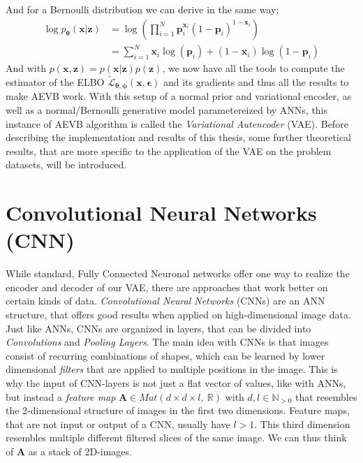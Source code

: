 \documentclass[12pt]{report}
\theoremstyle{definition}
\begin{document}
And for a Bernoulli distribution we can derive in the same way:
\begin{equation}
\begin{split}
\log p_{\pmb{\theta}}(\mathbf{x}|\mathbf{z})
& = \log \left(\prod_{i=1}^N \mathbf{p}_i^{\mathbf{x}_i}(1-\mathbf{p}_i)^{1-\mathbf{x}_i}\right) \\
& = \sum_{i=1}^N \mathbf{x}_i \log(\mathbf{p}_i) + (1 - \mathbf{x}_i) \log(1 - \mathbf{p}_i)
\end{split}
\end{equation}
And with $p(\mathbf{x}, \mathbf{z}) = p(\mathbf{x}|\mathbf{z})p(\mathbf{z})$, we now have all the tools to compute the estimator of the ELBO $\tilde{\mathcal{L}}_{\pmb{\theta}, \pmb{\phi}}(\mathbf{x}, \pmb{\epsilon})$ and its gradients and thus all the results to make AEVB work. With this setup of a normal prior and variational encoder, as well as a normal/Bernoulli generative model parametereized by ANNs, this instance of AEVB algorithm is called the \emph{Variational Autencoder} (VAE). Before describing the implementation and results of this thesis, some further theoretical results, that are more specific to the application of the VAE on the problem datasets, will be introduced.


\section{Convolutional Neural Networks (CNN)}
While standard, Fully Connected Neuronal networks offer one way to realize the encoder and decoder of our VAE, there are approaches that work better on certain kinds of data. \emph{Convolutional Neural Networks} (CNNs) are an ANN structure, that offers good results when applied on high-dimensional image data. Just like ANNs, CNNs are organized in layers, that can be divided into \emph{Convolutions} and \emph{Pooling Layers}.
The main idea with CNNs is that images consist of recurring combinations of shapes, which can be learned by lower dimensional \emph{filters} that are applied to multiple positions in the image. This is why the input of CNN-layers is not just a flat vector of values, like with ANNs, but instead a \emph{feature map} $\mathbf{A} \in Mat(d \times d \times l, \ \mathbb{R})$ with $d, l \in \mathbb{N}_{>0}$ that resembles the 2-dimensional structure of images in the first two dimensions. Feature maps, that are not input or output of a CNN, usually have $l>1$. This third dimension resembles multiple different filtered slices of the same image. We can thus think of $\mathbf{A}$ as a stack of 2D-images.
\end{document}

